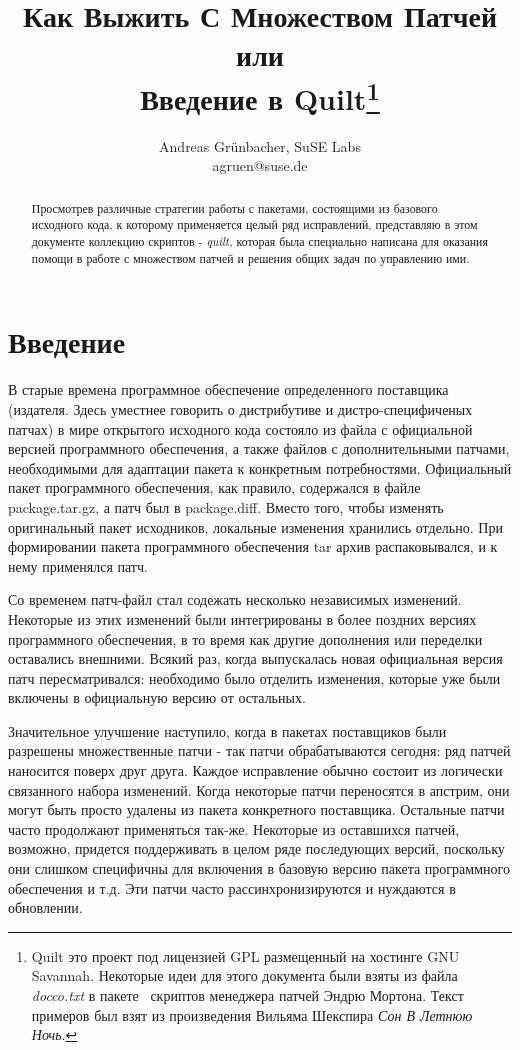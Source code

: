 \documentclass{article}
\title{Как Выжить С Множеством Патчей\\
{\Large или}\\
Введение в Quilt\footnote{
Quilt это проект под лицензией GPL размещенный на хостинге GNU Savannah. Некоторые идеи для этого документа были взяты из файла \textit{docco.txt} в пакете~\cite{akpm02} скриптов менеджера патчей Эндрю Мортона.
Текст примеров был взят из произведения Вильяма Шекспира \textit{Сон В Летнюю Ночь}.
}}
\author{Andreas Grünbacher, SuSE Labs \\
{\normalsize agruen@suse.de}
}
\begin{document}
\maketitle

\thispagestyle{empty}

\begin{abstract}
Просмотрев различные стратегии работы с пакетами, состоящими из базового исходного кода, к которому применяется целый ряд исправлений, представляю в этом документе коллекцию скриптов - \textit{quilt,} которая была специально написана для оказания помощи в работе с множеством патчей и решения общих задач по управлению ими.
\end{abstract}

\section{Введение}


В старые времена программное обеспечение определенного поставщика (издателя. Здесь уместнее говорить о дистрибутиве и дистро-специфиченых патчах) в мире открытого исходного кода состояло из файла с официальной версией программного обеспечения, а также файлов с дополнительными патчами, необходимыми для адаптации пакета к конкретным потребностями. Официальный пакет программного обеспечения, как правило, содержался в файле \textsf{package.tar.gz}, а патч был в \textsf{package.diff.} Вместо того, чтобы изменять оригинальный пакет исходников, локальные изменения хранились отдельно. При формировании пакета программного обеспечения tar архив распаковывался, и к нему применялся патч.

Со временем патч-файл стал содежать несколько независимых изменений. Некоторые из этих изменений были интегрированы в более поздних версиях программного обеспечения, в то время как другие дополнения или переделки оставались внешними. Всякий раз, когда выпускалась новая официальная версия патч пересматривался: необходимо было отделить изменения, которые уже были включены в официальную версию от остальных.

Значительное улучшение наступило, когда в пакетах поставщиков были разрешены множественные патчи - так патчи обрабатываются сегодня: ряд патчей наносится поверх друг друга. Каждое исправление обычно состоит из логически связанного набора изменений. Когда некоторые патчи переносятся в апстрим, они могут быть просто удалены из пакета конкретного поставщика. Остальные патчи часто продолжают применяться так-же. Некоторые из оставшихся патчей, возможно, придется поддерживать в целом ряде последующих версий, поскольку они слишком специфичны для включения в базовую версию пакета программного обеспечения и т.д. Эти патчи часто рассинхронизируются и нуждаются в обновлении.
\end{document}

